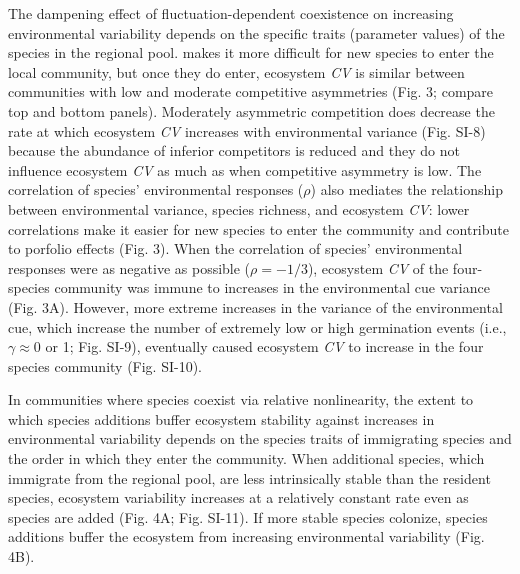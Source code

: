 \documentclass[12pt,]{article}
\begin{document}
The dampening effect of fluctuation-dependent coexistence on increasing
environmental variability depends on the specific traits (parameter
values) of the species in the regional pool.
 makes
it more difficult for new species to enter the local community, but once
they do enter, ecosystem \emph{CV} is similar between communities with
low and moderate competitive asymmetries (Fig. 3; compare top and bottom
panels). Moderately asymmetric competition does decrease the rate at
which ecosystem \emph{CV} increases with environmental variance (Fig.
SI-8) because the abundance of inferior competitors is reduced and they
do not influence ecosystem \emph{CV} as much as when competitive
asymmetry is low. The correlation of species' environmental responses
(\(\rho\)) also mediates the relationship between environmental
variance, species richness, and ecosystem \emph{CV}: lower correlations
make it easier for new species to enter the community and contribute to
porfolio effects (Fig. 3). When the correlation of species'
environmental responses were as negative as possible (\(\rho = -1/3\)),
ecosystem \emph{CV} of the four-species community was immune to
increases in the environmental cue variance (Fig. 3A). However, more
extreme increases in the variance of the environmental cue, which
increase the number of extremely low or high germination events (i.e.,
\(\gamma \approx 0\) or 1; Fig. SI-9), eventually caused ecosystem
\emph{CV} to increase in the four species community (Fig. SI-10).

In communities where species coexist via relative nonlinearity, the
extent to which species additions buffer ecosystem stability against
increases in environmental variability depends on the species traits of
immigrating species and the order in which they enter the community.
When additional species, which immigrate from the regional pool, are
less intrinsically stable than the resident species, ecosystem
variability increases at a relatively constant rate even as species are
added (Fig. 4A; Fig. SI-11). If more stable species colonize, species
additions buffer the ecosystem from increasing environmental variability
(Fig. 4B).

\end{document}
